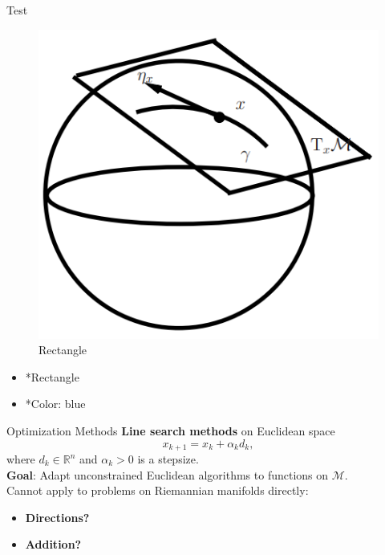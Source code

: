 \documentclass[9pt]{beamer}
\begin{document}
\begin{frame}{Test}
    \begin{minipage}{0.5\textwidth}
        \begin{figure}[H]
        \includegraphics{img/Tangent_Space.png}
        \caption{\label{fig:blue_rectangle} Rectangle}
        \end{figure}
    \end{minipage} \hfill
    \begin{minipage}{0.45\textwidth}
        \begin{itemize}
        \item *Rectangle
        \item *Color: blue
        \end{itemize}
    \end{minipage}
\end{frame}

\begin{frame}{Optimization Methods}
    \textbf{Line search methods} on Euclidean space
    \begin{equation*}
        x_{k+1} = x_k + \alpha_k d_k,
    \end{equation*}
    where $d_k \in \mathbb{R}^n$ and $\alpha_k > 0$ is a stepsize. \\[1.\baselineskip]

    \textbf{Goal}: Adapt unconstrained Euclidean algorithms to functions on $\mathcal{M}$. \\[1.\baselineskip]

    Cannot apply to problems on Riemannian manifolds directly:
    \begin{itemize}
        \item \textbf{Directions?}
        \item \textbf{Addition?}
    \end{itemize}
\end{frame}
\end{document}
